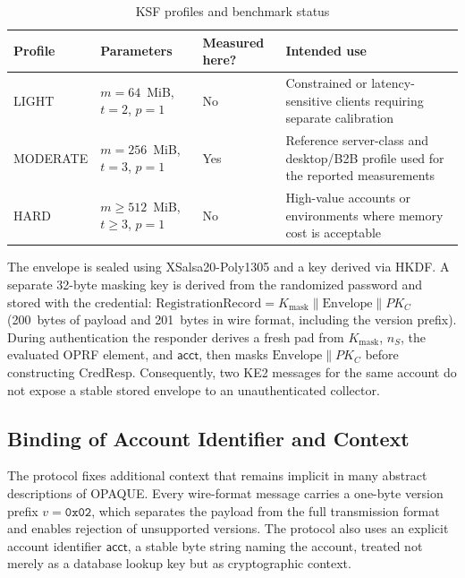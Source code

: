 \documentclass[preprint,12pt]{elsarticle}
\newcommand{\acct}{\mathsf{acct}}
\theoremstyle{remark}
\begin{document}
\begin{table}[htbp]
\caption{KSF profiles and benchmark status}
\label{tab:ksf-profiles}
\centering\small
\begin{tabularx}{\textwidth}{@{}L{2.4cm}L{3.3cm}L{3.0cm}X@{}}
\toprule
Profile & Parameters & Measured here? & Intended use \\
\midrule
LIGHT & $m=64$~MiB, $t=2$, $p=1$ & No & Constrained or latency-sensitive clients requiring separate calibration \\
MODERATE & $m=256$~MiB, $t=3$, $p=1$ & Yes & Reference server-class and desktop/B2B profile used for the reported measurements \\
HARD & $m\geq512$~MiB, $t\geq3$, $p=1$ & No & High-value accounts or environments where memory cost is acceptable \\
\bottomrule
\end{tabularx}
\end{table}
The envelope is sealed using XSalsa20-Poly1305 and a key derived via
HKDF. A separate 32-byte masking key is derived from the randomized
password and stored with the credential:
$\mathrm{RegistrationRecord} = K_{\mathrm{mask}} \| \mathrm{Envelope} \| PK_C$
(200~bytes of payload and 201~bytes in wire format, including the
version prefix). During authentication the responder derives a fresh
pad from $K_{\mathrm{mask}}$, $n_S$, the evaluated OPRF element, and
$\acct$, then masks $\mathrm{Envelope} \| PK_C$ before constructing
$\mathrm{CredResp}$. Consequently, two KE2 messages for the same account
do not expose a stable stored envelope to an unauthenticated collector.

\subsection{Binding of Account Identifier and Context}

The protocol fixes additional context that remains implicit in many
abstract descriptions of OPAQUE. Every wire-format message carries a
one-byte version prefix $v = \mathtt{0x02}$, which separates the
payload from the full transmission format and enables rejection of
unsupported versions. The protocol also uses an explicit account
identifier $\acct$, a stable byte string naming the account, treated not
merely as a database lookup key but as cryptographic context.
\end{document}
